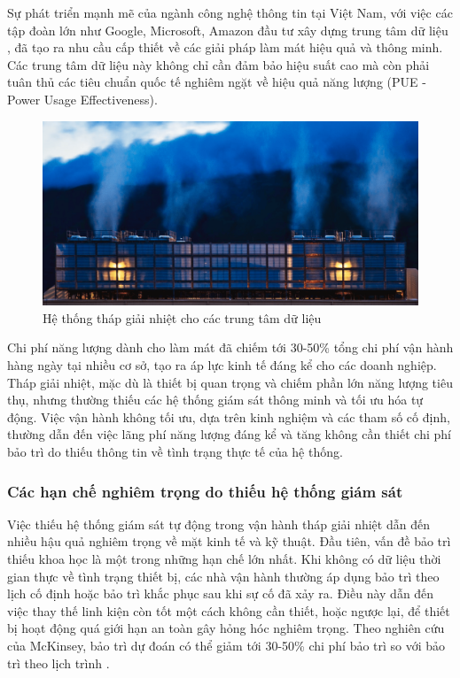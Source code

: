 \documentclass[../main.tex]{subfiles}
\begin{document}
Sự phát triển mạnh mẽ của ngành công nghệ thông tin tại Việt Nam, với việc các tập đoàn lớn như Google, Microsoft, Amazon đầu tư xây dựng trung tâm dữ liệu \cite{google2023datacenter,microsoft2023azure}, đã tạo ra nhu cầu cấp thiết về các giải pháp làm mát hiệu quả và thông minh. Các trung tâm dữ liệu này không chỉ cần đảm bảo hiệu suất cao mà còn phải tuân thủ các tiêu chuẩn quốc tế nghiêm ngặt về hiệu quả năng lượng (PUE - Power Usage Effectiveness).

\begin{figure}
    \centering
    \includegraphics[width=1\textwidth]{Hinhve/google_dls_002.png}
    \caption{Hệ thống tháp giải nhiệt cho các trung tâm dữ liệu}
    \label{fig:google_dls_002}
\end{figure}

Chi phí năng lượng dành cho làm mát đã chiếm tới 30-50\% tổng chi phí vận hành hàng ngày tại nhiều cơ sở, tạo ra áp lực kinh tế đáng kể cho các doanh nghiệp. Tháp giải nhiệt, mặc dù là thiết bị quan trọng và chiếm phần lớn năng lượng tiêu thụ, nhưng thường thiếu các hệ thống giám sát thông minh và tối ưu hóa tự động. Việc vận hành không tối ưu, dựa trên kinh nghiệm và các tham số cố định, thường dẫn đến việc lãng phí năng lượng đáng kể và tăng không cần thiết chi phí bảo trì do thiếu thông tin về tình trạng thực tế của hệ thống.

\subsubsection{Các hạn chế nghiêm trọng do thiếu hệ thống giám sát}

Việc thiếu hệ thống giám sát tự động trong vận hành tháp giải nhiệt dẫn đến nhiều hậu quả nghiêm trọng về mặt kinh tế và kỹ thuật. Đầu tiên, vấn đề bảo trì thiếu khoa học là một trong những hạn chế lớn nhất. Khi không có dữ liệu thời gian thực về tình trạng thiết bị, các nhà vận hành thường áp dụng bảo trì theo lịch cố định hoặc bảo trì khắc phục sau khi sự cố đã xảy ra. Điều này dẫn đến việc thay thế linh kiện còn tốt một cách không cần thiết, hoặc ngược lại, để thiết bị hoạt động quá giới hạn an toàn gây hỏng hóc nghiêm trọng. Theo nghiên cứu của McKinsey, bảo trì dự đoán có thể giảm tới 30-50\% chi phí bảo trì so với bảo trì theo lịch trình \cite{mckinsey2023digital}.
\end{document}
